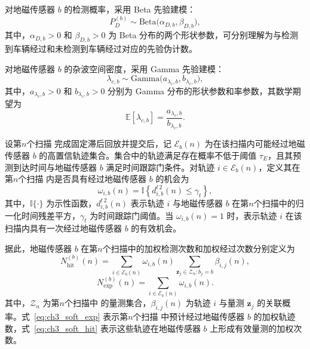 \documentclass{xdupgthesis}
\begin{document}
对地磁传感器 $b$ 的检测概率，采用 Beta 先验建模：
\begin{equation}
	P_D^{(b)}\sim \mathrm{Beta}\bigl(\alpha_{D,b},\beta_{D,b}\bigr),
	\label{eq:ch3_beta_prior}
\end{equation}
其中，$\alpha_{D,b}>0$ 和 $\beta_{D,b}>0$ 为 Beta 分布的两个形状参数，可分别理解为与检测到车辆经过和未检测到车辆经过对应的先验伪计数。

对地磁传感器 $b$ 的杂波空间密度，采用 Gamma 先验建模：
\begin{equation}
	\lambda_{c,b}\sim \mathrm{Gamma}\bigl(a_{\lambda_c,b},b_{\lambda_c,b}\bigr),
	\label{eq:ch3_gamma_prior}
\end{equation}
其中，$a_{\lambda_c,b}>0$ 和 $b_{\lambda_c,b}>0$ 分别为 Gamma 分布的形状参数和率参数，其数学期望为
\begin{equation}
	\mathbb{E}[\lambda_{c,b}]
	=
	\frac{a_{\lambda_c,b}}{b_{\lambda_c,b}}.
	\label{eq:ch3_kappa_mean}
\end{equation}

设第$n$个扫描 完成固定滞后回放并提交后，记 $\mathcal E_b(n)$ 为在该扫描内可能经过地磁传感器 $b$ 的高置信轨迹集合。集合中的轨迹满足存在概率不低于阈值 $\tau_E$，且其预测到达时间与地磁传感器 $b$ 满足时间跟踪门条件。对轨迹 $i\in\mathcal E_b(n)$，定义其在第$n$个扫描 内是否具有经过地磁传感器 $b$ 的机会为
\begin{equation}
	\omega_{i,b}(n)
	=
	\mathbb I\left\{d^{t\,2}_{i,b}(n)\le \gamma_t\right\},
	\label{eq:ch3_pass_indicator}
\end{equation}
其中，$\mathbb I\{\cdot\}$ 为示性函数，$d^{t\,2}_{i,b}(n)$ 表示轨迹 $i$ 与地磁传感器 $b$ 在第$n$个扫描中的归一化时间残差平方，$\gamma_t$ 为时间跟踪门阈值。当 $\omega_{i,b}(n)=1$ 时，表示轨迹 $i$ 在该扫描内具有一次经过地磁传感器 $b$ 的有效机会。

据此，地磁传感器 $b$ 在第$n$个扫描中的加权检测次数和加权经过次数分别定义为
\begin{equation}
	N_{\mathrm{hit}}^{(b)}(n)
	=
	\sum_{i\in\mathcal E_b(n)}
	\omega_{i,b}(n)
	\sum_{\mathbf z_j\in \mathcal Z_n:b_j=b}
	\beta_{i,j}(n),
	\label{eq:ch3_soft_hit}
\end{equation}
\begin{equation}
	N_{\mathrm{exp}}^{(b)}(n)
	=
	\sum_{i\in\mathcal E_b(n)}
	\omega_{i,b}(n).
	\label{eq:ch3_soft_exp}
\end{equation}
其中，$\mathcal Z_n$ 为第$n$个扫描中 的量测集合，$\beta_{i,j}(n)$ 为轨迹 $i$ 与量测 $\mathbf z_j$ 的关联概率。式~\eqref{eq:ch3_soft_exp} 表示第$n$个扫描 中预计经过地磁传感器 $b$ 的加权轨迹数，式~\eqref{eq:ch3_soft_hit} 表示这些轨迹在地磁传感器 $b$ 上形成有效量测的加权次数。
\end{document}
